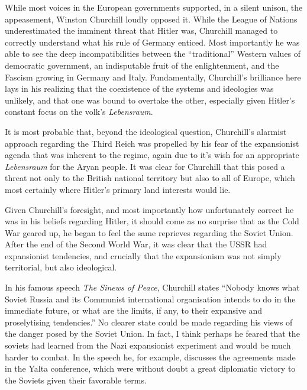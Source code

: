 \documentclass[12pt,letterpaper]{article}
\begin{document}
\begin{spacing}{2}
    While most voices in the European governments supported, in a silent
    unison, the appeasement, Winston Churchill loudly opposed it. While the
    League of Nations underestimated the imminent threat that Hitler was,
    Churchill managed to correctly understand what his rule of Germany enticed.
    Most importantly he was able to see the deep incompatibilities between the
    ``traditional'' Western values of democratic government, an indisputable
    fruit of the enlightenment, and the Fascism growing in Germany and Italy.
    Fundamentally, Churchill's brilliance here lays in his realizing that the
    coexistence of the systems and ideologies was unlikely, and that one was
    bound to overtake the other, especially given Hitler's constant focus on
    the volk's \emph{Lebensraum}.

    It is most probable that, beyond the ideological question, Churchill's
    alarmist approach regarding the Third Reich was propelled by his fear of the
    expansionist agenda that was inherent to the regime, again due to it's wish
    for an appropriate \emph{Lebensraum} for the Aryan people. It was clear for
    Churchill that this posed a threat not only to the British national
    territory but also to all of Europe, which most certainly where Hitler's
    primary land interests would lie.

    Given Churchill's foresight, and most importantly how unfortunately correct
    he was in his beliefs regarding Hitler, it should come as no surprise that
    as the Cold War geared up, he began to feel the same reprieves regarding the
    Soviet Union. After the end of the Second World War, it was clear that the
    USSR had expansionist tendencies, and crucially that the expansionism was
    not simply territorial, but also ideological.

    In his famous speech \emph{The Sinews of Peace}, Churchill states ``Nobody
    knows what Soviet Russia and its Communist international organisation
    intends to do in the immediate future, or what are the limits, if any, to
    their expansive and proselytising tendencies.'' No clearer state could be
    made regarding his views of the danger posed by the Soviet Union. In fact, I
    think perhaps he feared that the soviets had learned from the Nazi
    expansionist experiment and would be much harder to combat. In the speech
    he, for example, discusses the agreements made in the Yalta conference,
    which were without doubt a great diplomatic victory to the Soviets given
    their favorable terms.


\end{spacing}
\end{document}
